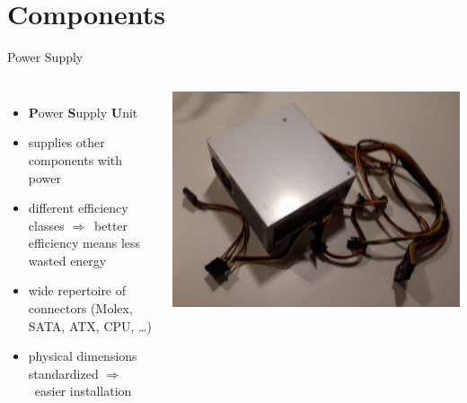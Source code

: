 \documentclass[10pt, graphics, aspectratio=169, table]{beamer}
\newcommand{\ra}{$\Rightarrow$\ }
\begin{document}
	\section{Components}
	\begin{frame}{Power Supply}
        \begin{columns}
                \begin{itemize}
                	\item \textbf{P}ower \textbf{S}upply \textbf{U}nit
                    \item supplies other components with power
                    \item different efficiency classes \ra better efficiency means less wasted energy
                    \item wide repertoire of connectors (Molex, SATA, ATX, CPU, \ldots)
                    \item physical dimensions standardized \ra easier installation
                \end{itemize}
                \center\includegraphics[scale=0.1]{img/psu.jpeg}
        \end{columns}
    \end{frame}
    
\end{document}
